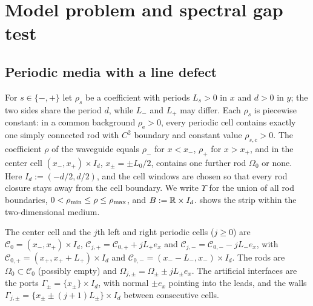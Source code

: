 \section{Model problem and spectral gap test}\label{sec:model}

\subsection{Periodic media with a line defect}
For $s\in\{-,+\}$ let $\rho_s$ be a coefficient with periods $L_s>0$ in $x$ and
$d>0$ in $y$; the two sides share the period $d$, while $L_-$ and $L_+$ may
differ. Each $\rho_s$ is piecewise constant: in a common background
$\rho_{\mathrm e}>0$, every periodic cell contains exactly one simply connected
rod with $C^2$ boundary and constant value $\rho_{s,\mathrm c}>0$. The
coefficient $\rho$ of the waveguide equals $\rho_-$ for $x<x_-$, $\rho_+$ for
$x>x_+$, and in the center cell $(x_-,x_+)\times I_d$, $x_\pm=\pm L_0/2$,
contains one further rod $\Omega_0$ or none. Here $I_d:=(-d/2,d/2)$, and the
cell windows are chosen so that every rod closure stays away from the cell
boundary. We write $\Upsilon$ for the union of all rod boundaries,
$0<\rho_{\min}\le\rho\le\rho_{\max}$, and $B:=\mathbb{R}\times I_d$. 
shows the strip within the two-dimensional medium.

The center cell and the $j$th left and right periodic cells ($j\ge0$) are
$\mathcal C_0=(x_-,x_+)\times I_d$, $\mathcal C_{j,+}=\mathcal C_{0,+}+jL_+e_x$ and
$\mathcal C_{j,-}=\mathcal C_{0,-}-jL_-e_x$, with
$\mathcal C_{0,+}=(x_+,x_++L_+)\times I_d$ and
$\mathcal C_{0,-}=(x_--L_-,x_-)\times I_d$. The rods are $\Omega_0\subset\mathcal C_0$
(possibly empty) and $\Omega_{j,\pm}=\Omega_\pm\pm jL_\pm e_x$. The artificial
interfaces are the ports $\Gamma_\pm=\{x_\pm\}\times I_d$, with normal $\pm e_x$
pointing into the leads, and the walls $\Gamma_{j,\pm}=\{x_\pm\pm(j+1)L_\pm\}\times
I_d$ between consecutive cells.



